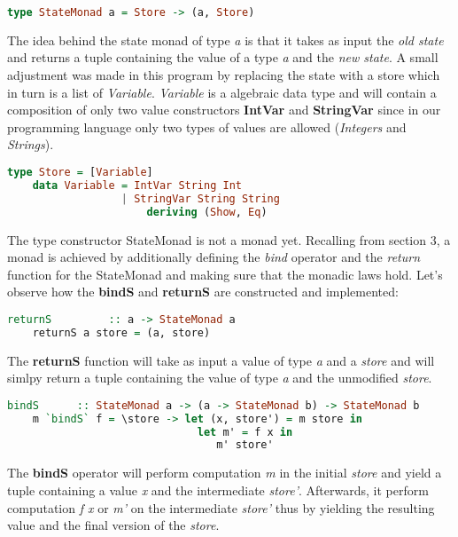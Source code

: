 \documentclass[a4paper, onecolumn]{article}
\begin{document}
    \begin{tcolorbox}
    \begin{lstlisting}[language=Haskell] 
    type StateMonad a = Store -> (a, Store) 
    \end{lstlisting}
    \end{tcolorbox}
    \noindent The idea behind the state monad of type \textit{a} is that it takes as input the \textit{old state} and returns a tuple containing the value of a type \textit{a} and the \textit{new state}. A small adjustment was made in this program by replacing the state with a store which in turn is a list of \textit{Variable}. \textit{Variable} is a algebraic data type and will contain a composition of only two value constructors \textbf{IntVar} and \textbf{StringVar} since in our programming language only two types of values are allowed (\textit{Integers} and \textit{Strings}). 
    
    \begin{tcolorbox}
    \begin{lstlisting}[language=Haskell] 
    type Store = [Variable]
    data Variable = IntVar String Int 
                  | StringVar String String 
                      deriving (Show, Eq) 
    \end{lstlisting}
    \end{tcolorbox}
    
    \noindent The type constructor StateMonad is not a monad yet. Recalling from section 3, a monad is achieved by additionally defining the \textit{bind} operator and the \textit{return} function for the StateMonad and making sure that the monadic laws hold. Let's observe how the \textbf{bindS} and \textbf{returnS} are constructed and implemented: 
    
    \begin{tcolorbox}
    \begin{lstlisting}[language=Haskell] 
    returnS         :: a -> StateMonad a 
    returnS a store = (a, store)
    \end{lstlisting}
    \end{tcolorbox}
    \noindent The \textbf{returnS} function will take as input a value of type \textit{a} and a \textit{store} and will simlpy return a tuple containing the value of type \textit{a} and the unmodified \textit{store}.
    \begin{tcolorbox}
    \begin{lstlisting}[language=Haskell] 
    bindS      :: StateMonad a -> (a -> StateMonad b) -> StateMonad b
    m `bindS` f = \store -> let (x, store') = m store in
                              let m' = f x in
                                 m' store'  
    \end{lstlisting}
    \end{tcolorbox}
    \noindent The \textbf{bindS} operator will perform computation \textit{m} in the initial \textit{store} and yield a tuple containing a value \textit{x} and the intermediate \textit{store'}. Afterwards, it perform computation \textit{f x} or \textit{m'} on the intermediate \textit{store'} thus by yielding the resulting value and the final version of the \textit{store}. 
    
\end{document}
